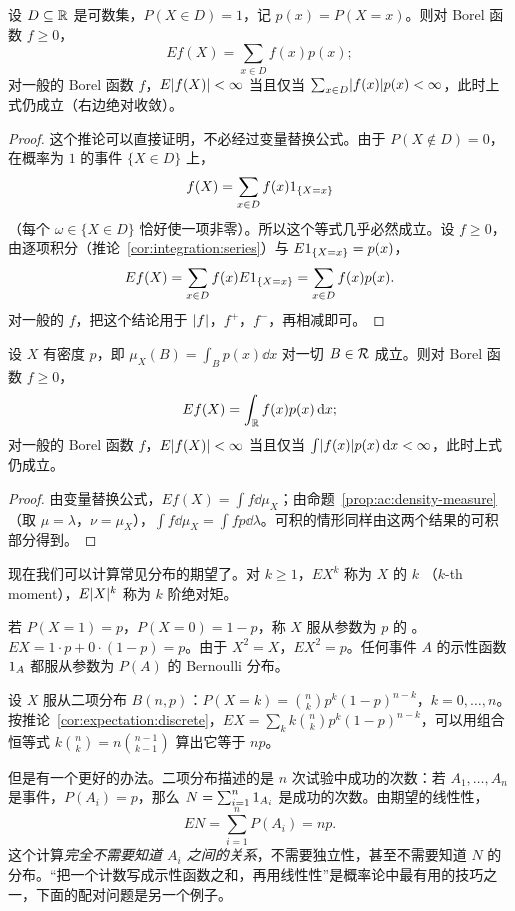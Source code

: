 \begin{corollary}[离散型随机变量]\label{cor:expectation:discrete}
设 $D\subseteq\mathbb{R}$ 是可数集，$P(X\in D)=1$，记 $p(x)=P(X=x)$。则对 Borel 函数 $f\geqslant0$，
\[
Ef(X)=\sum_{x\in D}f(x)p(x);
\]
对一般的 Borel 函数 $f$，$E\lvert f(X)\rvert<\infty$ 当且仅当 $\sum_{x\in D}\lvert f(x)\rvert p(x)<\infty$，此时上式仍成立（右边绝对收敛）。
\end{corollary}
\begin{proof}
这个推论可以直接证明，不必经过变量替换公式。由于 $P(X\notin D)=0$，在概率为 $1$ 的事件 $\{X\in D\}$ 上，
\[
f(X)=\sum_{x\in D}f(x)1_{\{X=x\}}
\]
（每个 $\omega\in\{X\in D\}$ 恰好使一项非零）。所以这个等式几乎必然成立。设 $f\geqslant0$，由逐项积分（推论~\ref{cor:integration:series}）与 $E1_{\{X=x\}}=p(x)$，
\[
Ef(X)=\sum_{x\in D}f(x)E1_{\{X=x\}}=\sum_{x\in D}f(x)p(x).
\]
对一般的 $f$，把这个结论用于 $\lvert f\rvert$，$f^+$，$f^-$，再相减即可。
\end{proof}

\begin{corollary}[有密度的随机变量]\label{cor:expectation:density}
设 $X$ 有密度 $p$，即 $\mu_X(B)=\int_Bp(x)\dd x$ 对一切 $B\in\mathcal{R}$ 成立。则对 Borel 函数 $f\geqslant0$，
\[
Ef(X)=\int_{\mathbb{R}} f(x)p(x)\,\mathrm{d} x;
\]
对一般的 Borel 函数 $f$，$E\lvert f(X)\rvert<\infty$ 当且仅当 $\int\lvert f(x)\rvert p(x)\,\mathrm{d} x<\infty$，此时上式仍成立。
\end{corollary}
\begin{proof}
由变量替换公式，$Ef(X)=\int f\dd\mu_X$；由命题~\ref{prop:ac:density-measure}（取 $\mu=\lambda$，$\nu=\mu_X$），$\int f\dd\mu_X=\int fp\dd\lambda$。可积的情形同样由这两个结果的可积部分得到。
\end{proof}

现在我们可以计算常见分布的期望了。对 $k\geqslant1$，$EX^k$ 称为 $X$ 的 $k$ （$k$-th moment），$E\lvert X\rvert^k$ 称为 $k$ 阶绝对矩。

\begin{example}\label{ex:expectation:bernoulli}
若 $P(X=1)=p$，$P(X=0)=1-p$，称 $X$ 服从参数为 $p$ 的 。$EX=1\cdot p+0\cdot(1-p)=p$。由于 $X^2=X$，$EX^2=p$。任何事件 $A$ 的示性函数 $1_A$ 都服从参数为 $P(A)$ 的 Bernoulli 分布。
\end{example}

\begin{example}\label{ex:expectation:binomial}
设 $X$ 服从二项分布 $B(n,p)$：$P(X=k)=\binom nkp^k(1-p)^{n-k}$，$k=0,\dots,n$。按推论~\ref{cor:expectation:discrete}，$EX=\sum_kk\binom nkp^k(1-p)^{n-k}$，可以用组合恒等式 $k\binom nk=n\binom{n-1}{k-1}$ 算出它等于 $np$。

但是有一个更好的办法。二项分布描述的是 $n$ 次试验中成功的次数：若 $A_1,\dots,A_n$ 是事件，$P(A_i)=p$，那么 $N=\sum_{i=1}^n1_{A_i}$ 是成功的次数。由期望的线性性，
\[
EN=\sum_{i=1}^nP(A_i)=np .
\]
这个计算\emph{完全不需要知道 $A_i$ 之间的关系}，不需要独立性，甚至不需要知道 $N$ 的分布。“把一个计数写成示性函数之和，再用线性性”是概率论中最有用的技巧之一，下面的配对问题是另一个例子。
\end{example}

